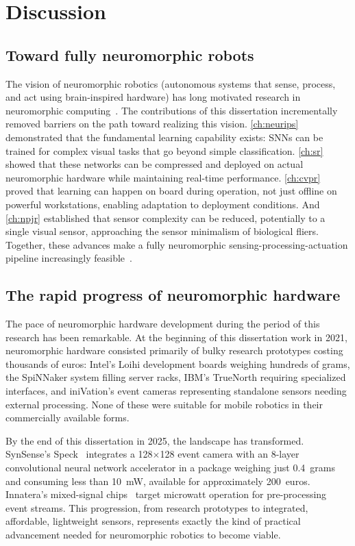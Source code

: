 \section{Discussion}

\subsection*{Toward fully neuromorphic robots}

The vision of neuromorphic robotics (autonomous systems that sense, process, and act using brain-inspired hardware) has long motivated research in neuromorphic computing~\cite{sandamirskaya2022neuromorphic}. The contributions of this dissertation incrementally removed barriers on the path toward realizing this vision. \cref{ch:neurips} demonstrated that the fundamental learning capability exists: SNNs can be trained for complex visual tasks that go beyond simple classification. \cref{ch:sr} showed that these networks can be compressed and deployed on actual neuromorphic hardware while maintaining real-time performance. \cref{ch:cvpr} proved that learning can happen on board during operation, not just offline on powerful workstations, enabling adaptation to deployment conditions. And \cref{ch:npjr} established that sensor complexity can be reduced, potentially to a single visual sensor, approaching the sensor minimalism of biological fliers. Together, these advances make a fully neuromorphic sensing-processing-actuation pipeline increasingly feasible~\cite{yang2023neuromorphic}.

\subsection*{The rapid progress of neuromorphic hardware}

The pace of neuromorphic hardware development during the period of this research has been remarkable. At the beginning of this dissertation work in 2021, neuromorphic hardware consisted primarily of bulky research prototypes costing thousands of euros: Intel's Loihi development boards weighing hundreds of grams, the SpiNNaker system filling server racks, IBM's TrueNorth requiring specialized interfaces, and iniVation's event cameras representing standalone sensors needing external processing. None of these were suitable for mobile robotics in their commercially available forms.

By the end of this dissertation in 2025, the landscape has transformed. SynSense's Speck~\cite{richter2024speck} integrates a 128$\times$128 event camera with an 8-layer convolutional neural network accelerator in a package weighing just 0.4~grams and consuming less than 10~mW, available for approximately 200~euros. Innatera's mixed-signal chips~\cite{innatera2025pulsar} target microwatt operation for pre-processing event streams. This progression, from research prototypes to integrated, affordable, lightweight sensors, represents exactly the kind of practical advancement needed for neuromorphic robotics to become viable.

